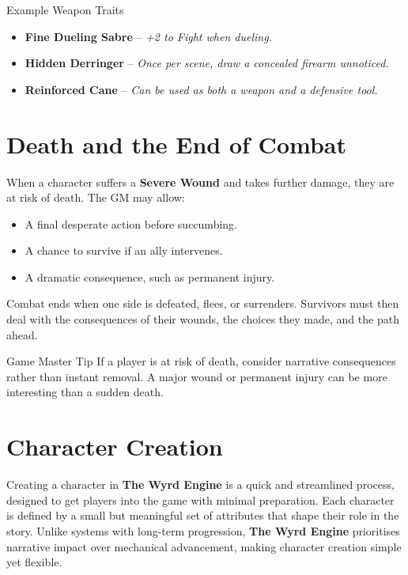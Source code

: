 \begin{DndReadAloud}{Example Weapon Traits}
\begin{itemize}
    \item \textbf{Fine Dueling Sabre} – \textit{+2 to Fight when dueling.}
    \item \textbf{Hidden Derringer} – \textit{Once per scene, draw a concealed firearm unnoticed.}
    \item \textbf{Reinforced Cane} – \textit{Can be used as both a weapon and a defensive tool.}
\end{itemize}
\end{DndReadAloud}

\section{Death and the End of Combat}
When a character suffers a \textbf{Severe Wound} and takes further damage, they are at risk of death. The GM may allow:
\begin{itemize}
    \item A final desperate action before succumbing.
    \item A chance to survive if an ally intervenes.
    \item A dramatic consequence, such as permanent injury.
\end{itemize}

Combat ends when one side is defeated, flees, or surrenders. Survivors must then deal with the consequences of their wounds, the choices they made, and the path ahead.

\begin{DndComment}{Game Master Tip}
If a player is at risk of death, consider narrative consequences rather than instant removal. A major wound or permanent injury can be more interesting than a sudden death.
\end{DndComment}


\section{Character Creation}

Creating a character in \textbf{The Wyrd Engine} is a quick and streamlined process, designed to get players into the game with minimal preparation. Each character is defined by a small but meaningful set of attributes that shape their role in the story. Unlike systems with long-term progression, \textbf{The Wyrd Engine} prioritises narrative impact over mechanical advancement, making character creation simple yet flexible.

